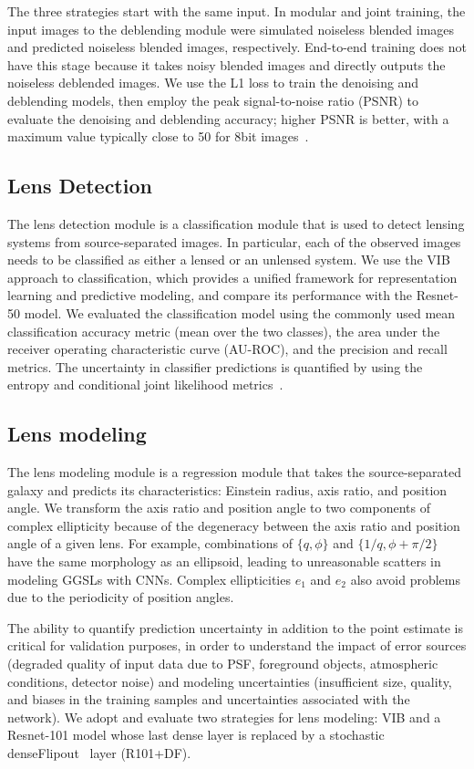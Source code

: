 \documentclass[12pt, twocolumn, apj]{openjournal}
\begin{document}
The three strategies start with the same input. In modular and joint training, the input images to the deblending module were simulated noiseless blended images and predicted noiseless blended images, respectively. End-to-end training does not have this stage because it takes noisy blended images and directly outputs the noiseless deblended images. 
We use the L1 loss to train the denoising and deblending models, 
then employ the peak signal-to-noise ratio (PSNR) to evaluate the denoising and deblending accuracy; higher PSNR is better, with a maximum value typically close to 50 for 8bit images~\cite{sonka2014image}.

\subsection{Lens Detection}
\label{sec:lens_detection_pipe}
The lens detection module is a classification module that is used to detect lensing systems from source-separated images. In particular, each of the observed images needs to be classified as either a lensed or an unlensed system. We use the VIB approach to classification, which provides a unified framework for representation learning and predictive modeling, and compare its performance with the Resnet-50 model. 
We evaluated the classification model using the commonly used mean classification accuracy metric (mean over the two classes), the area under the receiver operating characteristic curve (AU-ROC), and the precision and recall metrics. The uncertainty in classifier predictions is quantified by using the entropy and conditional joint likelihood metrics~\citep{alemi2018uncertainty}.

\subsection{Lens modeling}
\label{sec:regression_theory}
The lens modeling module is a regression module that takes the source-separated galaxy and predicts its characteristics: Einstein radius, axis ratio, and position angle. We transform the axis ratio and position angle to two components of complex ellipticity because of the degeneracy between the axis ratio and position angle of a given lens. For example, combinations of $\{q, \phi\}$ and $\{1/q, \phi+\pi/2\}$ have the same morphology as an ellipsoid, leading to unreasonable scatters in modeling GGSLs with CNNs. Complex ellipticities $e_1$ and $e_2$ also avoid problems due to the periodicity of position angles.

The ability to quantify prediction uncertainty in addition to the point estimate is critical for validation purposes, in order to understand the impact of error sources (degraded quality of input data due to PSF, foreground objects, atmospheric conditions, detector noise) and modeling uncertainties (insufficient size, quality, and biases in the training samples and uncertainties associated with the network).  
We adopt and evaluate two strategies for lens modeling: VIB and a Resnet-101 model whose last dense layer is replaced by a stochastic denseFlipout~\cite{wen2018flip} layer (R101+DF).
\end{document}
